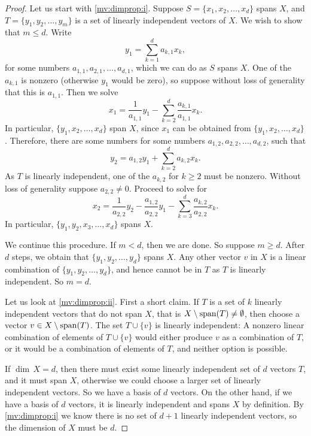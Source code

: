 \begin{proof}
Let us start with \ref{mv:dimprop:i}.
Suppose $S = \{ x_1 , x_2, \ldots, x_d \}$ spans $X$, and
$T = \{ y_1, y_2, \ldots, y_m \}$ is a set of linearly independent
vectors of $X$.  We wish to show that $m \leq d$.
Write
\begin{equation*}
y_1 = \sum_{k=1}^d a_{k,1} x_k ,
\end{equation*}
for some numbers $a_{1,1},a_{2,1},\ldots,a_{d,1}$,
which we can do as $S$ spans $X$.  One of the
$a_{k,1}$ is nonzero (otherwise $y_1$ would be zero),
so suppose without loss of generality that this
is $a_{1,1}$.  Then we solve
\begin{equation*}
x_1 = \frac{1}{a_{1,1}} y_1 - \sum_{k=2}^d \frac{a_{k,1}}{a_{1,1}} x_k .
\end{equation*}
In particular, $\{ y_1 , x_2, \ldots, x_d \}$ span $X$, since $x_1$ can be
obtained from $\{ y_1 , x_2, \ldots, x_d \}$.  Therefore, there are some numbers
for some numbers $a_{1,2},a_{2,2},\ldots,a_{d,2}$, such that
\begin{equation*}
y_2 = a_{1,2} y_1 + \sum_{k=2}^d a_{k,2} x_k .
\end{equation*}
As $T$ is linearly independent, one of the $a_{k,2}$
for $k \geq 2$ must be nonzero.  Without loss of generality suppose 
$a_{2,2} \not= 0$.  Proceed to solve for 
\begin{equation*}
x_2 = \frac{1}{a_{2,2}} y_2 - \frac{a_{1,2}}{a_{2,2}} y_1 - \sum_{k=3}^d
\frac{a_{k,2}}{a_{2,2}} x_k .
\end{equation*}
In particular,
$\{ y_1 , y_2, x_3, \ldots, x_d \}$ spans $X$.

We continue this procedure.  If $m < d$, then we are done.  So suppose
$m \geq d$.
After $d$ steps, we obtain that 
$\{ y_1 , y_2, \ldots, y_d \}$ spans $X$.  Any
other vector $v$ in $X$ is a linear combination of
$\{ y_1 , y_2, \ldots, y_d \}$, and hence cannot be in $T$ as $T$ is
linearly independent.  So $m = d$.

Let us look at \ref{mv:dimprop:ii}.
First a short claim.
If $T$ is a set of $k$ linearly independent vectors
that do not span $X$, that is $X \setminus
\operatorname{span} (T) \not= \emptyset$, then choose a vector $v \in X \setminus
\operatorname{span} (T)$.  The set $T \cup \{ v \}$ is linearly independent:
A nonzero linear combination of elements of $T \cup \{ v \}$ would either
produce $v$ as a combination of $T$, or it would be a combination of
elements of $T$, and neither option is possible.

If $\dim \, X = d$,
then there must exist some linearly independent set of $d$ vectors $T$,
and it must span $X$, otherwise we could choose a larger set of linearly
independent vectors.  So we have a basis of $d$ vectors.
On the other hand, if we have a basis of $d$ vectors,
it is linearly independent and spans $X$ by definition.
By \ref{mv:dimprop:i} we know
there is no set of $d+1$ linearly independent vectors,
so the dimension of $X$ must be $d$.


\end{proof}
